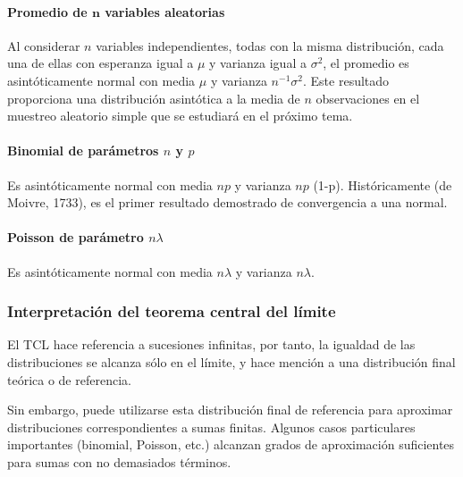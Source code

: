 \documentclass[
]{article}
\begin{document}
\paragraph{\texorpdfstring{Promedio de \(\boldsymbol{n}\) variables aleatorias}{Promedio de \textbackslash boldsymbol\{n\} variables aleatorias}}\label{promedio-de-boldsymboln-variables-aleatorias}

Al considerar \(n\) variables independientes, todas con la misma distribución, cada una de ellas con esperanza igual a \(\mu\) y varianza igual a \(\sigma^{2}\), el promedio es asintóticamente normal con media \(\mu\) y varianza \(n^{-1} \sigma^{2}\). Este resultado proporciona una distribución asintótica a la media de \(n\) observaciones en el muestreo aleatorio simple que se estudiará en el próximo tema.

\paragraph{\texorpdfstring{Binomial de parámetros \(n\) y \(p\)}{Binomial de parámetros n y p}}\label{binomial-de-paruxe1metros-n-y-p}

Es asintóticamente normal con media \(n p\) y varianza \(n p\) (1-p). Históricamente (de Moivre, 1733), es el primer resultado demostrado de convergencia a una normal.

\paragraph{\texorpdfstring{Poisson de parámetro \(n \lambda\)}{Poisson de parámetro n \textbackslash lambda}}\label{poisson-de-paruxe1metro-n-lambda}

Es asintóticamente normal con media \(n \lambda\) y varianza \(n \lambda\).

\subsubsection{Interpretación del teorema central del límite}\label{interpretaciuxf3n-del-teorema-central-del-luxedmite}

El TCL hace referencia a sucesiones infinitas, por tanto, la igualdad de las distribuciones se alcanza sólo en el límite, y hace mención a una distribución final teórica o de referencia.

Sin embargo, puede utilizarse esta distribución final de referencia para aproximar distribuciones correspondientes a sumas finitas. Algunos casos particulares importantes (binomial, Poisson, etc.) alcanzan grados de aproximación suficientes para sumas con no demasiados términos.
\end{document}
